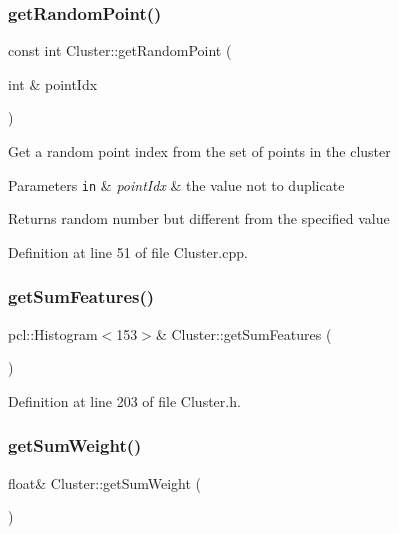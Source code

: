 \subsubsection{\texorpdfstring{get\+Random\+Point()}{getRandomPoint()}\hspace{0.1cm}{\footnotesize\ttfamily [2/2]}}
{\footnotesize\ttfamily const int Cluster\+::get\+Random\+Point (\begin{DoxyParamCaption}\item[{int \&}]{point\+Idx }\end{DoxyParamCaption})}

Get a random point index from the set of points in the cluster


\begin{DoxyParams}[1]{Parameters}
\mbox{\tt in}  & {\em point\+Idx} & the value not to duplicate\\
\hline
\end{DoxyParams}
Returns random number but different from the specified value 

Definition at line 51 of file Cluster.\+cpp.

\mbox{\label{class_cluster_ab5d2cbdb6de3a6efbecaab959503714b}} 
\subsubsection{\texorpdfstring{get\+Sum\+Features()}{getSumFeatures()}}
{\footnotesize\ttfamily pcl\+::\+Histogram$<$153$>$\& Cluster\+::get\+Sum\+Features (\begin{DoxyParamCaption}{ }\end{DoxyParamCaption})\hspace{0.3cm}{\ttfamily [inline]}}



Definition at line 203 of file Cluster.\+h.

\mbox{\label{class_cluster_ac011ee866632afed7b36759f9675f01f}} 
\subsubsection{\texorpdfstring{get\+Sum\+Weight()}{getSumWeight()}}
{\footnotesize\ttfamily float\& Cluster\+::get\+Sum\+Weight (\begin{DoxyParamCaption}{ }\end{DoxyParamCaption})\hspace{0.3cm}{\ttfamily [inline]}}



